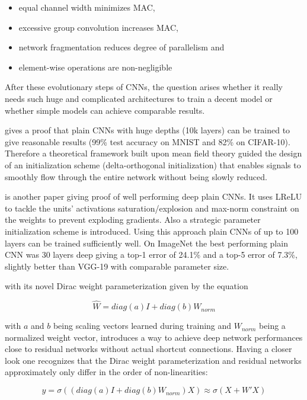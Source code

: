 \begin{itemize}
	\item equal channel width minimizes MAC, 
	\item excessive group convolution increases MAC, 
	\item network fragmentation reduces degree of parallelism and
	\item element-wise operations are non-negligible
\end{itemize}

After these evolutionary steps of CNNs, the question arises whether it really needs such huge and complicated architectures to train a decent model or whether simple models can achieve comparable results. 

\cite{Xiao.2018} gives a proof that plain CNNs with huge depths (10k layers) can be trained to give reasonable results (99\% test accuracy on MNIST and 82\% on CIFAR-10). Therefore a theoretical framework built upon mean field theory guided the design of an initialization scheme (delta-orthogonal initialization) that enables signals to smoothly flow through the entire network without being slowly reduced. 

\cite{OyebadeOyedotun.2020} is another paper giving proof of well performing deep plain CNNs. It uses LReLU to tackle the units' activations saturation/explosion and max-norm constraint on the weights to prevent exploding gradients. Also a strategic parameter initialization scheme is introduced. Using this approach plain CNNs of up to 100 layers can be trained sufficiently well. On ImageNet the best performing plain CNN was 30 layers deep giving a top-1 error of 24.1\% and a top-5 error of 7.3\%, slightly better than VGG-19 with comparable parameter size. 

\cite{SergeyZagoruyko.2018} with its novel Dirac weight parameterization given by the equation 

\begin{equation}
	\hat{W} = diag(a)I + diag(b)W_{norm}
\end{equation}

with $a$ and $b$ being scaling vectors learned during training and $W_{norm}$ being a normalized weight vector, introduces a way to achieve deep network performances close to residual networks without actual shortcut connections. Having a closer look one recognizes that the Dirac weight parameterization and residual networks approximately only differ in the order of non-linearities:

\begin{equation}
	y = \sigma((diag(a)I + diag(b)W_{norm}) X) \approx \sigma(X + W'X)
\end{equation}

